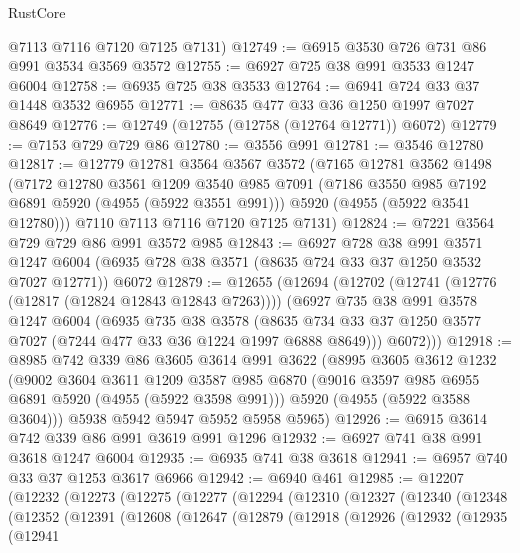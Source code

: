 \begin{lexlean}{RustCore}
\begin{coremodule}
      @7113
      @7116
      @7120
      @7125
      @7131)
@12749 := @6915 @3530 @726 @731 @86 @991 @3534 @3569 @3572
@12755 := @6927 @725 @38 @991 @3533 @1247 @6004
@12758 := @6935 @725 @38 @3533
@12764 := @6941 @724 @33 @37 @1448 @3532 @6955
@12771 := @8635 @477 @33 @36 @1250 @1997 @7027 @8649
@12776 := @12749 (@12755 (@12758 (@12764 @12771)) @6072)
@12779 := @7153 @729 @729 @86
@12780 := @3556 @991
@12781 := @3546 @12780
@12817 := @12779
    @12781
    @3564
    @3567
    @3572
    (@7165
      @12781
      @3562
      @1498
      (@7172
        @12780
        @3561
        @1209
        @3540
        @985
        @7091
        (@7186 @3550 @985 @7192 @6891 @5920 (@4955 (@5922 @3551 @991)))
        @5920
        (@4955 (@5922 @3541 @12780)))
      @7110
      @7113
      @7116
      @7120
      @7125
      @7131)
@12824 := @7221 @3564 @729 @729 @86 @991 @3572 @985
@12843 := @6927
    @728
    @38
    @991
    @3571
    @1247
    @6004
    (@6935 @728 @38 @3571 (@8635 @724 @33 @37 @1250 @3532 @7027 @12771))
    @6072
@12879 := @12655
    (@12694
      (@12702
        (@12741 (@12776 (@12817 (@12824 @12843 @12843 @7263))))
        (@6927
          @735
          @38
          @991
          @3578
          @1247
          @6004
          (@6935
            @735
            @38
            @3578
            (@8635 @734 @33 @37 @1250 @3577 @7027 (@7244 @477 @33 @36 @1224 @1997 @6888 @8649)))
          @6072)))
@12918 := @8985
    @742
    @339
    @86
    @3605
    @3614
    @991
    @3622
    (@8995
      @3605
      @3612
      @1232
      (@9002
        @3604
        @3611
        @1209
        @3587
        @985
        @6870
        (@9016 @3597 @985 @6955 @6891 @5920 (@4955 (@5922 @3598 @991)))
        @5920
        (@4955 (@5922 @3588 @3604)))
      @5938
      @5942
      @5947
      @5952
      @5958
      @5965)
@12926 := @6915 @3614 @742 @339 @86 @991 @3619 @991 @1296
@12932 := @6927 @741 @38 @991 @3618 @1247 @6004
@12935 := @6935 @741 @38 @3618
@12941 := @6957 @740 @33 @37 @1253 @3617 @6966
@12942 := @6940 @461
@12985 := @12207
    (@12232
      (@12273
        (@12275
          (@12277
            (@12294
              (@12310
                (@12327
                  (@12340
                    (@12348
                      (@12352
                        (@12391
                          (@12608
                            (@12647
                              (@12879
                                (@12918
                                  (@12926
                                    (@12932
                                      (@12935
                                        (@12941

\end{coremodule}
\end{lexlean}
